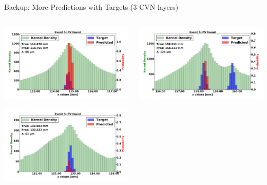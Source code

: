 \begin{frame}{Backup: More Predictions with Targets (3 CVN layers)}
  \begin{columns}[c]
        \begin{center}
            \includegraphics[width=1\textwidth,height=0.45\textwidth, trim=18 0 18 0]{images/120000_3layer_32.pdf}
    
            \includegraphics[width=1\textwidth, height=0.45\textwidth,trim=18 0 18 0]{images/120000_3layer_33.pdf}

        \end{center}
        \begin{center}
           \includegraphics[width=1\textwidth, height=0.45\textwidth, trim=18 0 18 0]{images/120000_3layer_34.pdf}
    

\end{center}
\end{columns}
\end{frame}
